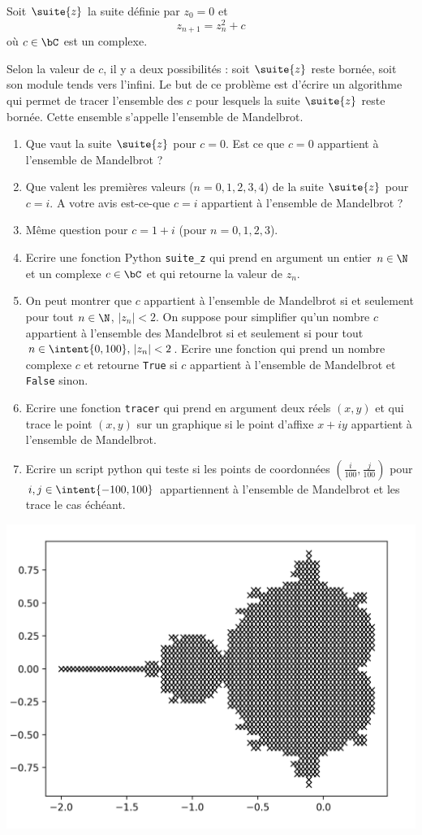 \begin{exercice}
Soit $\suite{z}$ la suite définie par $z_0=0$ et 
$$z_{n+1} =z_n^2 +c$$
où $c\in \bC$ est un complexe. 

Selon la valeur de $c$, il y a deux possibilités : soit $\suite{z}$ reste bornée, soit son module tends vers l'infini. Le but de ce problème est d'écrire un algorithme qui permet de tracer l'ensemble des $c$ pour lesquels la suite $\suite{z}$ reste bornée. Cette ensemble s'appelle l'ensemble de Mandelbrot. 
\begin{enumerate}
\item Que vaut la suite $\suite{z}$ pour $c=0$. Est ce que $c=0$ appartient à l'ensemble de Mandelbrot ?

\item Que valent les premières valeurs ($n=0,1,2,3,4$) de la suite $\suite{z}$ pour $c=i$.  A votre avis est-ce-que $c=i$ appartient à l'ensemble de Mandelbrot ? 
\item Même question pour $c=1+i$ (pour $n=0,1,2,3$).
\item Ecrire une fonction Python \texttt{suite\_z} qui prend en argument un entier $n\in \N$ et un complexe $c\in \bC$ et qui retourne la valeur de $z_n$.
\item On peut montrer que $c$ appartient à l'ensemble de Mandelbrot si et seulement pour tout $n\in \N$,  $|z_n|<2$.
On suppose pour simplifier qu'un nombre $c$ appartient à l'ensemble des Mandelbrot si et seulement si  pour tout $n\in \intent{0,100},   \, |z_n|<2$.
Ecrire une fonction  qui prend un nombre complexe $c$ et retourne \texttt{True} si $c$ appartient à l'ensemble de Mandelbrot et \texttt{False} sinon. 
\item Ecrire une fonction \texttt{tracer} qui prend en argument deux réels $(x,y)$ et qui trace le point $(x,y)$ sur un graphique si le point d'affixe $x+iy$ appartient à l'ensemble de Mandelbrot. 
\item Ecrire un script python qui teste  si les points de coordonnées $\left( \frac{i}{100}, \frac{j}{100}\right)$ pour $i, j\in \intent{-100,100}$ appartiennent à l'ensemble de Mandelbrot et les trace le cas échéant. 
\end{enumerate}
\begin{center}
\includegraphics[scale=0.4]{mandelbrot.png}

\end{center}
\end{exercice}
